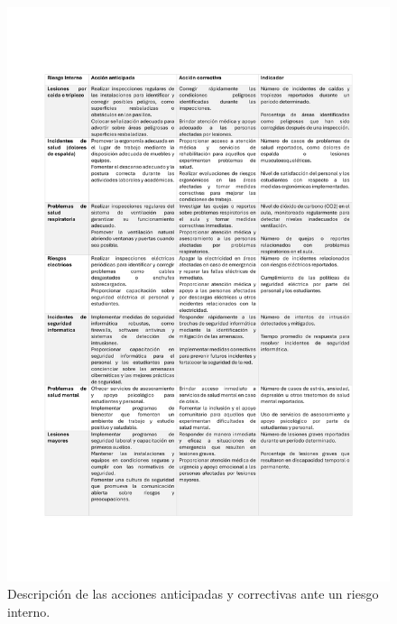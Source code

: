 \begin{figure}[H]
    \centering
    \includegraphics[scale=0.3]{15/img/tablaPlanDeAccionRiesgosInternos.pdf}
    \caption{Descripción de las acciones anticipadas y correctivas ante un riesgo interno.}
    \label{fig:tablaPlanDeAccionRiesgosInternos}
\end{figure}


